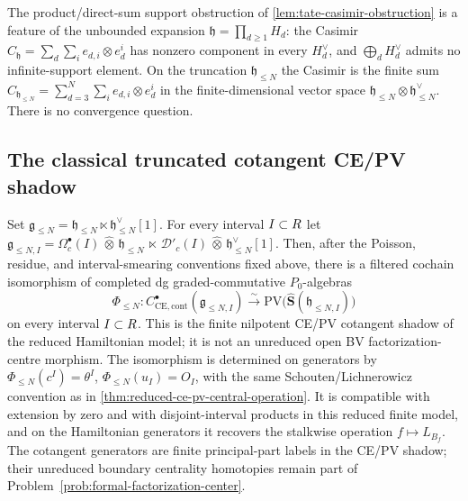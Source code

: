 \begin{rmk}
\label{rmk:why-no-tate-casimir}
The product/direct-sum support obstruction of
\ref{lem:tate-casimir-obstruction} is a feature of the unbounded
expansion $\mathfrak h=\prod_{d\geq 1}H_d$: the Casimir
$C_{\mathfrak h}=\sum_d\sum_i e_{d,i}\otimes e_d^i$ has nonzero
component in every $H_d^\vee$, and $\bigoplus_d H_d^\vee$ admits no
infinite-support element. On the truncation $\mathfrak h_{\leq N}$
the Casimir is the finite sum
$C_{\mathfrak h_{\leq N}}=\sum_{d=3}^N\sum_i e_{d,i}\otimes e_d^i$
in the finite-dimensional vector space
$\mathfrak h_{\leq N}\otimes\mathfrak h_{\leq N}^\vee$. There is
no convergence question.
\end{rmk}

\subsection*{The classical truncated cotangent CE/PV shadow}

\begin{thm}\label{thm:phi-trunc-classical}
Set
$\mathfrak g_{\leq N}=\mathfrak h_{\leq N}\ltimes
\mathfrak h_{\leq N}^\vee[1]$. For every interval $I\subset R$ let
$\mathfrak g_{\leq N,I}=
\Omega^\bullet_c(I)\,\widehat\otimes\,\mathfrak h_{\leq N}\,\ltimes\,
\mathcal D'_c(I)\,\widehat\otimes\,\mathfrak h_{\leq N}^\vee[1]$.
Then, after the Poisson, residue, and interval-smearing conventions fixed
above, there is a filtered cochain isomorphism of completed
dg graded-commutative $P_0$-algebras
$$\Phi_{\leq N}:
  C^\bullet_{\mathrm{CE},\mathrm{cont}}(\mathfrak g_{\leq N,I})
  \xrightarrow{\ \sim\ }
  \mathrm{PV}\bigl(\widehat{\mathbf S}(\mathfrak h_{\leq N,I})\bigr)$$
on every interval \(I\subset R\). This is the finite nilpotent
CE/PV cotangent shadow of the reduced Hamiltonian model; it is not an
unreduced open BV factorization-centre morphism. The isomorphism is determined on generators by
$\Phi_{\leq N}(c^I)=\theta^I$, $\Phi_{\leq N}(u_I)=O_I$, with the
same Schouten/Lichnerowicz convention as in
\ref{thm:reduced-ce-pv-central-operation}. It is compatible with extension
by zero and with disjoint-interval products in this reduced finite
model, and on the Hamiltonian generators it recovers the stalkwise
operation \(f\mapsto L_{B_f}\). The cotangent generators are finite
principal-part labels in the CE/PV shadow; their unreduced boundary
centrality homotopies remain part of
Problem~\ref{prob:formal-factorization-center}.
\end{thm}

